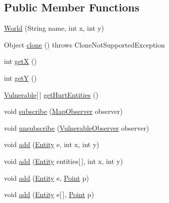 \subsection*{Public Member Functions}
\begin{DoxyCompactItemize}
\item 
\hyperlink{classjdungeon_1_1core_1_1world_1_1_world_abf431eef1cb2ad9db092e8459403a200}{World} (String name, int x, int y)
\item 
Object \hyperlink{classjdungeon_1_1core_1_1world_1_1_world_a2f8dfacbf6031222382fd92ab1544ed2}{clone} ()  throws CloneNotSupportedException 
\item 
int \hyperlink{classjdungeon_1_1core_1_1world_1_1_world_a1c3590e19ddc3b7c15652f340170d704}{getX} ()
\item 
int \hyperlink{classjdungeon_1_1core_1_1world_1_1_world_a8feef6fdb6341b8bbb0d4c3fedbee62e}{getY} ()
\item 
\hyperlink{classjdungeon_1_1core_1_1world_1_1_vulnerable}{Vulnerable}\mbox{[}$\,$\mbox{]} \hyperlink{classjdungeon_1_1core_1_1world_1_1_world_ad6d8dbb5988041a57cad42aa4b9f729e}{getHurtEntities} ()
\item 
void \hyperlink{classjdungeon_1_1core_1_1world_1_1_world_a091011deaa7ef3e85a14d3d8acfa5d6e}{subscribe} (\hyperlink{interfacejdungeon_1_1core_1_1world_1_1_map_observer}{MapObserver} observer)
\item 
void \hyperlink{classjdungeon_1_1core_1_1world_1_1_world_acf10ba5af090d902608f40674c84cb82}{unsubscribe} (\hyperlink{interfacejdungeon_1_1core_1_1world_1_1_vulnerable_observer}{VulnerableObserver} observer)
\item 
void \hyperlink{classjdungeon_1_1core_1_1world_1_1_world_a212b2befe7519c32de5a274cf962cf07}{add} (\hyperlink{classjdungeon_1_1core_1_1world_1_1_entity}{Entity} e, int x, int y)
\item 
void \hyperlink{classjdungeon_1_1core_1_1world_1_1_world_a4a9e3f989ee030cf350fd6dcfb6b6362}{add} (\hyperlink{classjdungeon_1_1core_1_1world_1_1_entity}{Entity} entities\mbox{[}$\,$\mbox{]}, int x, int y)
\item 
void \hyperlink{classjdungeon_1_1core_1_1world_1_1_world_a1597e074e16a601ed61c22a49fab6b69}{add} (\hyperlink{classjdungeon_1_1core_1_1world_1_1_entity}{Entity} e, \hyperlink{classjdungeon_1_1core_1_1world_1_1_point}{Point} p)
\item 
void \hyperlink{classjdungeon_1_1core_1_1world_1_1_world_a75a2877be3cbe7e5d21c6b7209ca66fa}{add} (\hyperlink{classjdungeon_1_1core_1_1world_1_1_entity}{Entity} e\mbox{[}$\,$\mbox{]}, \hyperlink{classjdungeon_1_1core_1_1world_1_1_point}{Point} p)

\end{DoxyCompactItemize}
